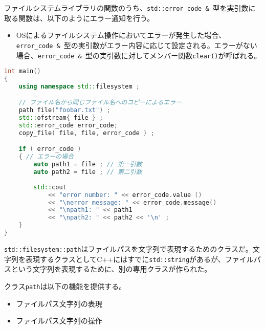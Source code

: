 %

ファイルシステムライブラリの関数のうち、\lstinline!std::error_code &!~型を実引数に取る関数は、以下のようにエラー通知を行う。

\begin{itemize}[leftmargin=*]
\item
  OSによるファイルシステム操作においてエラーが発生した場合、\lstinline!error_code &!~型の実引数がエラー内容に応じて設定される。エラーがない場合、\lstinline!error_code &!~型の実引数に対してメンバー関数\lstinline!clear()!が呼ばれる。
\end{itemize}

\begin{lstlisting}[language=C++]
int main()
{
    using namespace std::filesystem ;

    // ファイル名から同じファイル名へのコピーによるエラー
    path file("foobar.txt") ;
    std::ofstream{ file } ;
    std::error_code error_code;
    copy_file( file, file, error_code ) ;

    if ( error_code )
    { // エラーの場合
        auto path1 = file ; // 第一引数
        auto path2 = file ; // 第二引数
        
        std::cout
            << "error number: " << error_code.value ()
            << "\nerror message: " << error_code.message() 
            << "\npath1: " << path1
            << "\npath2: " << path2 << '\n' ;
    }
}
\end{lstlisting}

%

\lstinline!std::filesystem::path!はファイルパスを文字列で表現するためのクラスだ。文字列を表現するクラスとしてC++にはすでに\lstinline!std::string!があるが、ファイルパスという文字列を表現するために、別の専用クラスが作られた。

クラス\lstinline!path!は以下の機能を提供する。

\begin{itemize}
\itemsep1pt\parskip0pt
\item
  ファイルパス文字列の表現
\item
  ファイルパス文字列の操作
\end{itemize}

